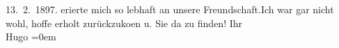 \begin{ledgroupsized}[t]{13cm}
{{{                     13. 2. 1897.}}}\label{K_L02481_1h} eri{\geminationn}erte mich so lebhaft an unsere Freundschaft.\hspace*{1.5em}Ich
               war gar nicht wohl, hoffe erholt zurückzuko{\geminationm}en u. Sie
                  da{\geminationn} zu finden!\pend
           \pstart
           Ihr{\\[\baselineskip]}\spacefill\mbox{Hugo}\pend
           \leftskip=0em{}\endnumbering{}\end{ledgroupsized}  \newcommand{\dateiname}{L02481}\newcommand{\titel}{Hugo Hofmannsthal an Arthur Schnitzler, 18. 2. 1927}\newcommand{\editorInnen}{Martin Anton Müller und Gerd-Hermann Susen}
      